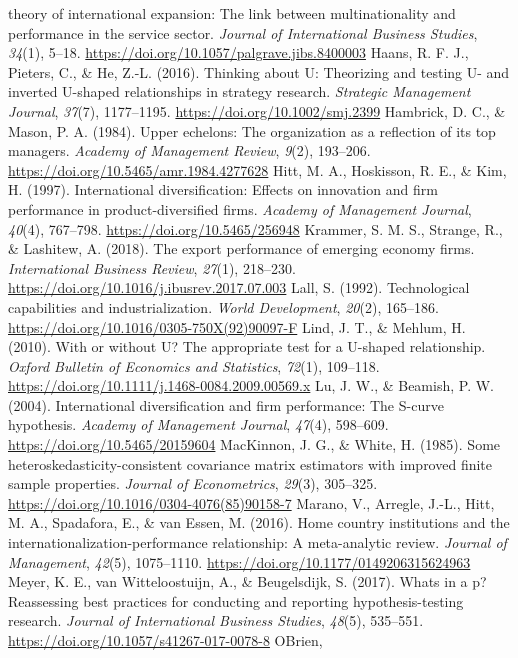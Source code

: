 \documentclass[12pt,a4paper]{article}
\begin{document}
theory of international expansion: The link between multinationality and
performance in the service sector. \emph{Journal of International
Business Studies}, \emph{34}(1), 5--18.
\url{https://doi.org/10.1057/palgrave.jibs.8400003} Haans, R. F. J.,
Pieters, C., \& He, Z.-L. (2016). Thinking about U: Theorizing and
testing U- and inverted U-shaped relationships in strategy research.
\emph{Strategic Management Journal}, \emph{37}(7), 1177--1195.
\url{https://doi.org/10.1002/smj.2399} Hambrick, D. C., \& Mason, P. A.
(1984). Upper echelons: The organization as a reflection of its top
managers. \emph{Academy of Management Review}, \emph{9}(2), 193--206.
\url{https://doi.org/10.5465/amr.1984.4277628} Hitt, M. A., Hoskisson,
R. E., \& Kim, H. (1997). International diversification: Effects on
innovation and firm performance in product-diversified firms.
\emph{Academy of Management Journal}, \emph{40}(4), 767--798.
\url{https://doi.org/10.5465/256948} Krammer, S. M. S., Strange, R., \&
Lashitew, A. (2018). The export performance of emerging economy firms.
\emph{International Business Review}, \emph{27}(1), 218--230.
\url{https://doi.org/10.1016/j.ibusrev.2017.07.003} Lall, S. (1992).
Technological capabilities and industrialization. \emph{World
Development}, \emph{20}(2), 165--186.
\url{https://doi.org/10.1016/0305-750X(92)90097-F} Lind, J. T., \&
Mehlum, H. (2010). With or without U? The appropriate test for a
U-shaped relationship. \emph{Oxford Bulletin of Economics and
Statistics}, \emph{72}(1), 109--118.
\url{https://doi.org/10.1111/j.1468-0084.2009.00569.x} Lu, J. W., \&
Beamish, P. W. (2004). International diversification and firm
performance: The S-curve hypothesis. \emph{Academy of Management
Journal}, \emph{47}(4), 598--609. \url{https://doi.org/10.5465/20159604}
MacKinnon, J. G., \& White, H. (1985). Some
heteroskedasticity-consistent covariance matrix estimators with improved
finite sample properties. \emph{Journal of Econometrics}, \emph{29}(3),
305--325. \url{https://doi.org/10.1016/0304-4076(85)90158-7} Marano, V.,
Arregle, J.-L., Hitt, M. A., Spadafora, E., \& van Essen, M. (2016).
Home country institutions and the internationalization-performance
relationship: A meta-analytic review. \emph{Journal of Management},
\emph{42}(5), 1075--1110. \url{https://doi.org/10.1177/0149206315624963}
Meyer, K. E., van Witteloostuijn, A., \& Beugelsdijk, S. (2017).
What\textquotesingle s in a p? Reassessing best practices for conducting
and reporting hypothesis-testing research. \emph{Journal of
International Business Studies}, \emph{48}(5), 535--551.
\url{https://doi.org/10.1057/s41267-017-0078-8} O\textquotesingle Brien,
\end{document}
